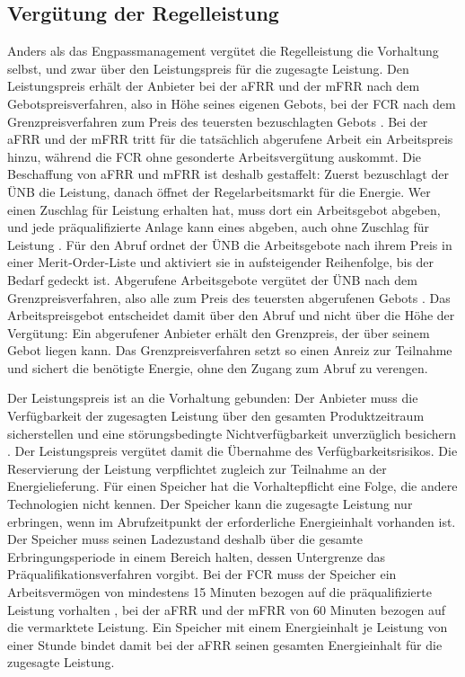 \subsection{Vergütung der Regelleistung}
\label{sec:balancing_procurement}

Anders als das Engpassmanagement vergütet die Regelleistung die Vorhaltung selbst, und zwar über den Leistungspreis für die zugesagte Leistung.
Den Leistungspreis erhält der Anbieter bei der \ac{aFRR} und der \ac{mFRR} nach dem Gebotspreisverfahren, also in Höhe seines eigenen Gebots, bei der \ac{FCR} nach dem Grenzpreisverfahren zum Preis des teuersten bezuschlagten Gebots \cite{regelleistung_ausschreibungsdaten_2026}.
Bei der \ac{aFRR} und der \ac{mFRR} tritt für die tatsächlich abgerufene Arbeit ein Arbeitspreis hinzu, während die \ac{FCR} ohne gesonderte Arbeitsvergütung auskommt.
Die Beschaffung von \ac{aFRR} und \ac{mFRR} ist deshalb gestaffelt: Zuerst bezuschlagt der \ac{ÜNB} die Leistung, danach öffnet der Regelarbeitsmarkt für die Energie.
Wer einen Zuschlag für Leistung erhalten hat, muss dort ein Arbeitsgebot abgeben, und jede präqualifizierte Anlage kann eines abgeben, auch ohne Zuschlag für Leistung \cite{bundesnetzagentur_monitoringbericht_2026}.
Für den Abruf ordnet der \ac{ÜNB} die Arbeitsgebote nach ihrem Preis in einer Merit-Order-Liste und aktiviert sie in aufsteigender Reihenfolge, bis der Bedarf gedeckt ist.
Abgerufene Arbeitsgebote vergütet der \ac{ÜNB} nach dem Grenzpreisverfahren, also alle zum Preis des teuersten abgerufenen Gebots \cite{europaische_kommission_verordnung_2017_ebgl}.
Das Arbeitspreisgebot entscheidet damit über den Abruf und nicht über die Höhe der Vergütung: Ein abgerufener Anbieter erhält den Grenzpreis, der über seinem Gebot liegen kann.
Das Grenzpreisverfahren setzt so einen Anreiz zur Teilnahme und sichert die benötigte Energie, ohne den Zugang zum Abruf zu verengen.

Der Leistungspreis ist an die Vorhaltung gebunden: Der Anbieter muss die Verfügbarkeit der zugesagten Leistung über den gesamten Produktzeitraum sicherstellen und eine störungsbedingte Nichtverfügbarkeit unverzüglich besichern \cite{ubertragungsnetzbetreiber_deutschland_praqualifikationsverfahren_2024}.
Der Leistungspreis vergütet damit die Übernahme des Verfügbarkeitsrisikos.
Die Reservierung der Leistung verpflichtet zugleich zur Teilnahme an der Energielieferung.
Für einen Speicher hat die Vorhaltepflicht eine Folge, die andere Technologien nicht kennen.
Der Speicher kann die zugesagte Leistung nur erbringen, wenn im Abrufzeitpunkt der erforderliche Energieinhalt vorhanden ist.
Der Speicher muss seinen Ladezustand deshalb über die gesamte Erbringungsperiode in einem Bereich halten, dessen Untergrenze das Präqualifikationsverfahren vorgibt.
Bei der \ac{FCR} muss der Speicher ein Arbeitsvermögen von mindestens 15 Minuten bezogen auf die präqualifizierte Leistung vorhalten \cite{europaische_kommission_verordnung_2017}, bei der \ac{aFRR} und der \ac{mFRR} von 60 Minuten bezogen auf die vermarktete Leistung.
Ein Speicher mit einem Energieinhalt je Leistung von einer Stunde bindet damit bei der \ac{aFRR} seinen gesamten Energieinhalt für die zugesagte Leistung.

